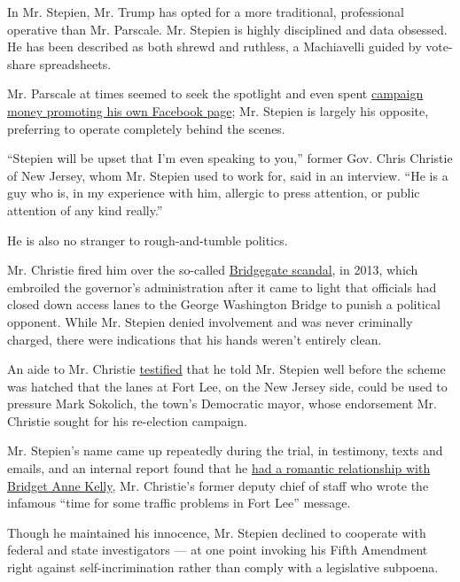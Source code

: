 In Mr. Stepien, Mr. Trump has opted for a more traditional, professional
operative than Mr. Parscale. Mr. Stepien is highly disciplined and data
obsessed. He has been described as both shrewd and ruthless, a
Machiavelli guided by vote-share spreadsheets.

Mr. Parscale at times seemed to seek the spotlight and even spent
\href{https://www.nytimes3xbfgragh.onion/2020/06/30/us/politics/brad-parscale-trump.html}{campaign
money promoting his own Facebook page}; Mr. Stepien is largely his
opposite, preferring to operate completely behind the scenes.

``Stepien will be upset that I'm even speaking to you,'' former Gov.
Chris Christie of New Jersey, whom Mr. Stepien used to work for, said in
an interview. ``He is a guy who is, in my experience with him, allergic
to press attention, or public attention of any kind really.''

He is also no stranger to rough-and-tumble politics.

Mr. Christie fired him over the so-called
\href{https://www.nytimes3xbfgragh.onion/news-event/bridgegate-chris-christie}{Bridgegate
scandal}, in 2013, which embroiled the governor's administration after
it came to light that officials had closed down access lanes to the
George Washington Bridge to punish a political opponent. While Mr.
Stepien denied involvement and was never criminally charged, there were
indications that his hands weren't entirely clean.

An aide to Mr. Christie
\href{https://www.nytimes3xbfgragh.onion/2016/09/27/nyregion/bridgegate-trial.html}{testified}
that he told Mr. Stepien well before the scheme was hatched that the
lanes at Fort Lee, on the New Jersey side, could be used to pressure
Mark Sokolich, the town's Democratic mayor, whose endorsement Mr.
Christie sought for his re-election campaign.

Mr. Stepien's name came up repeatedly during the trial, in testimony,
texts and emails, and an internal report found that he
\href{https://www.nytimes3xbfgragh.onion/2014/03/28/nyregion/chris-christie-lawyer-bridge-scandal-report.html}{had
a romantic relationship with Bridget Anne Kelly}, Mr. Christie's former
deputy chief of staff who wrote the infamous ``time for some traffic
problems in Fort Lee'' message.

Though he maintained his innocence, Mr. Stepien declined to cooperate
with federal and state investigators --- at one point invoking his Fifth
Amendment right against self-incrimination rather than comply with a
legislative subpoena.

